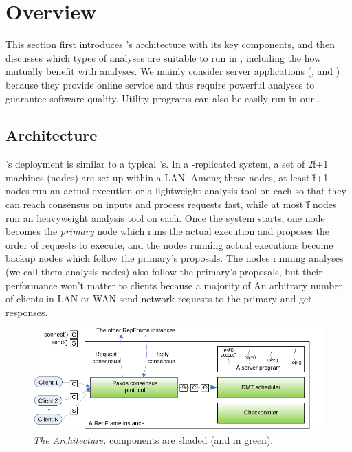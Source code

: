 \section{\xxx Overview} \label{sec:overview}

This section first introduces \xxx's architecture with its key components, and 
then discusses which types of analyses are suitable to run in \xxx, including 
the how \xxx mutually benefit with analyses. We mainly consider server 
applications (\eg, \mediatomb and \apache) because they provide online service 
and thus require powerful analyses to guarantee software quality. Utility 
programs can also be easily run in our \xxx.

\subsection{Architecture} \label{sec:arch}

\xxx's deployment is similar to a typical \smr's. In a \xxx-replicated
system, a set of 2\v{f}+1 machines (nodes) are set up within a LAN. Among these 
nodes, at least \v{f}+1 nodes run an actual execution or a lightweight analysis tool on each so that they can reach consensus on inputs and process requests fast, while at most \v{f} nodes run an heavyweight analysis tool on each. Once the \xxx system starts, 
one node becomes the \emph{primary} node which runs the actual execution and 
proposes the order of requests to execute, and the nodes running actual 
executions become backup nodes which follow the primary's proposals. The nodes 
running analyses (we call them analysis nodes) also follow the primary's 
proposals, but their performance won't matter to clients because a majority of 
An arbitrary number of clients in LAN or WAN send network requests to the primary
and get responses. 


\begin{figure}[t]
\vspace{.20in}
\centering
\includegraphics[width=.5\textwidth]{figures/arch}
\vspace{-.20in}
\caption{{\em The \xxx Architecture.} \xxx components are shaded (and in
  green).} \label{fig:arch}
\vspace{-.05in}
\end{figure}

